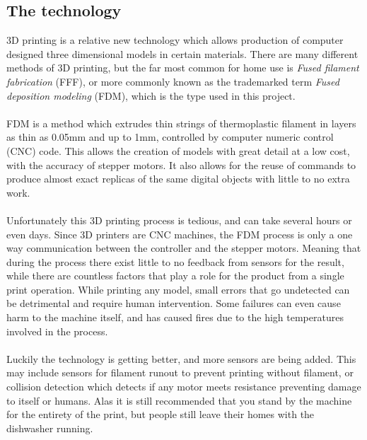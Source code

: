 \documentclass[a4paper, 12pt]{article}
\newcommand{\mysubsection}[1]{\subsection*{#1} \addcontentsline{toc}{subsection}{#1}}
\begin{document}
    \mysubsection{The technology}
    3D printing is a relative new technology which allows production of computer designed three dimensional models
    in certain materials.
    There are many different methods of 3D printing, but the far most common for home use is \textit{Fused filament
    fabrication} (FFF), or more commonly known as the trademarked term \textit{Fused deposition modeling} (FDM),
    which is the type used in this project.
    \\\\
    FDM is a method which extrudes thin strings of thermoplastic filament
    in layers as thin as 0.05mm and up to 1mm, controlled by computer numeric control (CNC) code.
    This allows the creation of models with great detail at a low cost, with the accuracy of stepper motors.
    It also allows for the reuse of commands to produce almost exact replicas of the same digital objects with
    little to no extra work.
    \\\\
    Unfortunately this 3D printing process is tedious, and can take several hours or even days.
    Since 3D printers are CNC machines, the FDM process is only a one way communication between the controller
    and the stepper motors.
    Meaning that during the process there exist little to no feedback from sensors for the result, while there are countless
    factors that play a role for the product from a single print operation.
    While printing any model, small errors that go undetected can be detrimental and require human intervention.
    Some failures can even cause harm to the machine itself, and has caused fires due to the high temperatures involved in
    the process.
    \\\\
    Luckily the technology is getting better, and more sensors are being added.
    This may include sensors for filament runout to prevent printing without filament, or collision detection which detects
    if any motor meets resistance preventing damage to itself or humans.
    Alas it is still recommended that you stand by the machine for the entirety of the print, but people still leave their
    homes with the dishwasher running.
\end{document}
